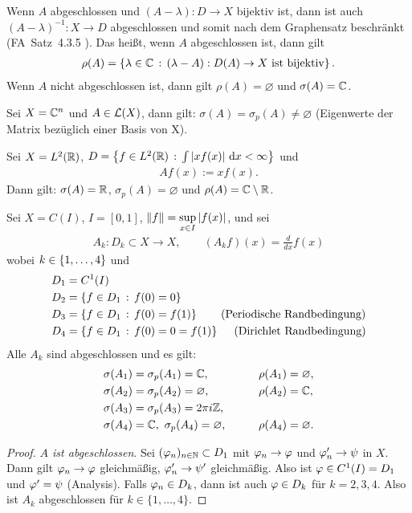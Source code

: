 \begin{bem*}
Wenn $A$ abgeschlossen und $(A-\lambda):D \to X$ bijektiv ist,
dann ist auch $(A-\lambda)^{-1} : X \to D$ abgeschlossen und somit nach
dem Graphensatz beschränkt (FA~Satz~4.3.5 \cite{Fun07}).
Das heißt, wenn $A$ abgeschlossen ist, dann gilt
\begin{align*}
\rho(A)=\left\{ \lambda \in \mathbb{C}\,:\,(\lambda-A) : D(A) \to X \text{ ist
bijektiv}\right\}.
\end{align*}
Wenn $A$ nicht abgeschlossen ist, dann gilt $\rho(A) = \varnothing$ und
$\sigma(A)=\mathbb{C}$.\maphere
\end{bem*}


\begin{bsp*}
\begin{bspenum}
\item
Sei $X = \mathbb{C}^{n}$ und $A \in \mathcal{L}(X)$, dann gilt: $\sigma(A) = \sigma_p(A) \ne
\varnothing$ (Eigenwerte der Matrix bezüglich einer Basis von X).
\item 
Sei $X = L^2(\mathbb{R})$, $D = \left\{ f \in L^2(\mathbb{R})\,:\,\int \left|xf(x)\right|\,\mathrm{d} x <
\infty\right\}$ und
\begin{align*}
Af(x) := xf(x).
\end{align*}
Dann gilt: $\sigma(A) = \mathbb{R}$, $\sigma_p(A) = \varnothing$ und 
$\rho(A) = \mathbb{C} \setminus \mathbb{R}$.
\item
Sei $X = C(I)$, $I=[0,1]$, $\left\|f\right\| = \sup \limits_{x \in I} \left|f(x)\right|$, 
und sei
\begin{align*}
A_k : D_k \subset X \to X,\qquad (A_kf)(x) = \frac{d}{dx}f(x)
\end{align*}
wobei $k \in \left\{ 1,\ldots,4 \right\}$ und
\begin{align*}
  D_1 & =  C^1(I)  \\
  D_2 & =  \left\{ f \in D_1\,:\,f(0)=0\right\}  \\
  D_3 & =  \left\{ f \in D_1\,:\,f(0)=f(1)\right\} \qquad \text{(Periodische
  Randbedingung)}\\
  D_4 & =  \left\{ f \in D_1\,:\,f(0)=0=f(1)\right\}\  \quad \text{(Dirichlet
  Randbedingung)}
\end{align*}
Alle $A_k$ sind abgeschlossen und es gilt:
\begin{align*}
  \sigma(A_1) & =  \sigma_p(A_1)  =  \mathbb{C},& \rho(A_1) &= \varnothing, \\
  \sigma(A_2) & =  \sigma_p(A_2)  =  \varnothing,&  \rho(A_2) &= \mathbb{C}, \\
  \sigma(A_3) & =  \sigma_p(A_3)  =  2 \pi i \mathbb{Z},  \\
  \sigma(A_4) & =  \mathbb{C},\ \sigma_p(A_4) = \varnothing,&\qquad
  \rho(A_4) &= \varnothing.
\end{align*}
\begin{proof}
\textit{$A$ ist abgeschlossen}.
Sei $(\varphi_n)_{n \in \mathbb{N}} \subset D_1$ mit $\varphi_n \to \varphi$ und $\varphi_n' \to \psi$ in $X$.
Dann gilt $\varphi_n \to \varphi$ gleichm\"a\ss{}ig, $\varphi_n' \to \psi'$ gleichm\"a\ss{}ig.
Also ist $\varphi \in C^1(I) = D_1$ und $\varphi' = \psi$ (Analysis).
Falls $\varphi_n \in D_k$, dann ist auch $\varphi \in D_k$ f\"ur $k=2,3,4$.
Also ist $A_k$ abgeschlossen f\"ur $k \in \{1,\ldots ,4\}$.


\end{proof}
\end{bspenum}
\end{bsp*}
